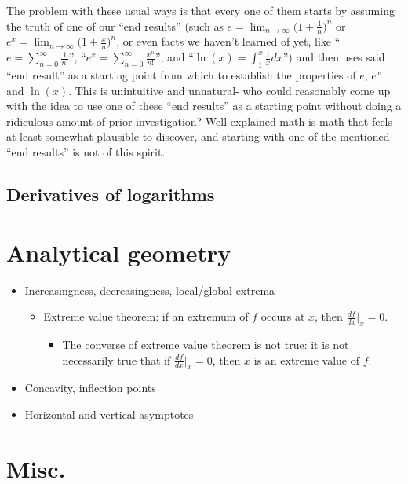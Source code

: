 The problem with these usual ways is that every one of them starts by assuming the truth of one of our ``end results'' (such as $e = \lim_{n \rightarrow \infty} \Big(1 + \frac{1}{n} \Big)^n$ or $e^x = \lim_{n \rightarrow \infty} \Big(1 + \frac{x}{n} \Big)^n$, or even facts we haven't learned of yet, like ``$e = \sum_{n = 0}^\infty \frac{1}{n!}$'', ``$e^x = \sum_{n = 0}^\infty \frac{x^n}{n!}$'', and ``$\ln(x) = \int_1^x \frac{1}{x} dx$'') and then uses said ``end result'' as a starting point from which to establish the properties of $e$, $e^x$ and $\ln(x)$. This is unintuitive and unnatural- who could reasonably come up with the idea to use one of these ``end results'' as a starting point without doing a ridiculous amount of prior investigation? Well-explained math is math that feels at least somewhat plausible to discover, and starting with one of the mentioned ``end results'' is not of this spirit.

\subsection*{Derivatives of logarithms}



\section*{Analytical geometry}

\begin{itemize}
    \item Increasingness, decreasingness, local/global extrema
    \begin{itemize}
        \item Extreme value theorem: if an extremum of $f$ occurs at $x$, then $\frac{df}{dx}\Big|_x = 0$.
        \begin{itemize}
            \item The converse of extreme value theorem is not true: it is not necessarily true that if $\frac{df}{dx}\Big|_x = 0$, then $x$ is an extreme value of $f$.
        \end{itemize}
    \end{itemize}
    \item Concavity, inflection points
    \item Horizontal and vertical asymptotes
\end{itemize}

\section*{Misc.}

